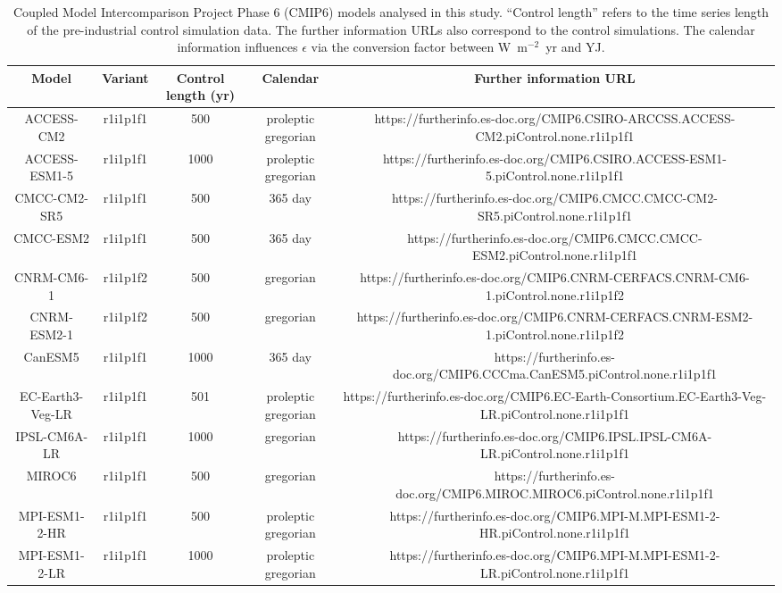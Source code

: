 \begin{table*}[t]
\centering
\caption{Coupled Model Intercomparison Project Phase 6 (CMIP6) models analysed in this study. ``Control length'' refers to the time series length of the pre-industrial control simulation data. The further information URLs also correspond to the control simulations. The calendar information influences $\epsilon$ via the conversion factor between W~m$^{-2}$~yr and YJ.}
\begin{tabular}{ccccc}
\toprule
Model & Variant & Control length (yr) & Calendar & Further information URL \\
\midrule
ACCESS-CM2 & r1i1p1f1 & 500 & proleptic gregorian & https://furtherinfo.es-doc.org/CMIP6.CSIRO-ARCCSS.ACCESS-CM2.piControl.none.r1i1p1f1 \\
ACCESS-ESM1-5 & r1i1p1f1 & 1000 & proleptic gregorian & https://furtherinfo.es-doc.org/CMIP6.CSIRO.ACCESS-ESM1-5.piControl.none.r1i1p1f1 \\
CMCC-CM2-SR5 & r1i1p1f1 & 500 & 365 day & https://furtherinfo.es-doc.org/CMIP6.CMCC.CMCC-CM2-SR5.piControl.none.r1i1p1f1 \\
CMCC-ESM2 & r1i1p1f1 & 500 & 365 day & https://furtherinfo.es-doc.org/CMIP6.CMCC.CMCC-ESM2.piControl.none.r1i1p1f1 \\
CNRM-CM6-1 & r1i1p1f2 & 500 & gregorian & https://furtherinfo.es-doc.org/CMIP6.CNRM-CERFACS.CNRM-CM6-1.piControl.none.r1i1p1f2 \\
CNRM-ESM2-1 & r1i1p1f2 & 500 & gregorian & https://furtherinfo.es-doc.org/CMIP6.CNRM-CERFACS.CNRM-ESM2-1.piControl.none.r1i1p1f2 \\
CanESM5 & r1i1p1f1 & 1000 & 365 day & https://furtherinfo.es-doc.org/CMIP6.CCCma.CanESM5.piControl.none.r1i1p1f1 \\
EC-Earth3-Veg-LR & r1i1p1f1 & 501 & proleptic gregorian & https://furtherinfo.es-doc.org/CMIP6.EC-Earth-Consortium.EC-Earth3-Veg-LR.piControl.none.r1i1p1f1 \\
IPSL-CM6A-LR & r1i1p1f1 & 1000 & gregorian & https://furtherinfo.es-doc.org/CMIP6.IPSL.IPSL-CM6A-LR.piControl.none.r1i1p1f1 \\
MIROC6 & r1i1p1f1 & 500 & gregorian & https://furtherinfo.es-doc.org/CMIP6.MIROC.MIROC6.piControl.none.r1i1p1f1 \\
MPI-ESM1-2-HR & r1i1p1f1 & 500 & proleptic gregorian & https://furtherinfo.es-doc.org/CMIP6.MPI-M.MPI-ESM1-2-HR.piControl.none.r1i1p1f1 \\
MPI-ESM1-2-LR & r1i1p1f1 & 1000 & proleptic gregorian & https://furtherinfo.es-doc.org/CMIP6.MPI-M.MPI-ESM1-2-LR.piControl.none.r1i1p1f1 \\

\end{tabular}
\end{table*}
